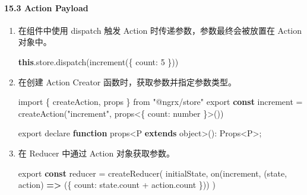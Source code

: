 \documentclass[
]{article}
\newenvironment{Shaded}{}{}
\newcommand{\AttributeTok}[1]{\textcolor[rgb]{0.49,0.56,0.16}{#1}}
\newcommand{\DataTypeTok}[1]{\textcolor[rgb]{0.56,0.13,0.00}{#1}}
\newcommand{\DecValTok}[1]{\textcolor[rgb]{0.25,0.63,0.44}{#1}}
\newcommand{\FunctionTok}[1]{\textcolor[rgb]{0.02,0.16,0.49}{#1}}
\newcommand{\ImportTok}[1]{#1}
\newcommand{\KeywordTok}[1]{\textcolor[rgb]{0.00,0.44,0.13}{\textbf{#1}}}
\newcommand{\NormalTok}[1]{#1}
\newcommand{\OperatorTok}[1]{\textcolor[rgb]{0.40,0.40,0.40}{#1}}
\newcommand{\StringTok}[1]{\textcolor[rgb]{0.25,0.44,0.63}{#1}}
\begin{document}
\hypertarget{153-action-payload}{%
\paragraph{15.3 Action Payload}\label{153-action-payload}}

\begin{enumerate}
\def\labelenumi{\arabic{enumi}.}
\item
  在组件中使用 dispatch 触发 Action 时传递参数，参数最终会被放置在
  Action 对象中。

\begin{Shaded}
\begin{Highlighting}[]
\KeywordTok{this}\OperatorTok{.}\AttributeTok{store}\OperatorTok{.}\FunctionTok{dispatch}\NormalTok{(}\FunctionTok{increment}\NormalTok{(\{ }\DataTypeTok{count}\OperatorTok{:} \DecValTok{5}\NormalTok{ \}))}
\end{Highlighting}
\end{Shaded}
\item
  在创建 Action Creator 函数时，获取参数并指定参数类型。

\begin{Shaded}
\begin{Highlighting}[]
\ImportTok{import}\NormalTok{ \{ createAction}\OperatorTok{,}\NormalTok{ props \} }\ImportTok{from} \StringTok{"@ngrx/store"}
\ImportTok{export} \KeywordTok{const}\NormalTok{ increment }\OperatorTok{=} \FunctionTok{createAction}\NormalTok{(}\StringTok{"increment"}\OperatorTok{,}\NormalTok{ props}\OperatorTok{\textless{}}\NormalTok{\{ }\DataTypeTok{count}\OperatorTok{:}\NormalTok{ number \}}\OperatorTok{\textgreater{}}\NormalTok{())}
\end{Highlighting}
\end{Shaded}

\begin{Shaded}
\begin{Highlighting}[]
\ImportTok{export}\NormalTok{ declare }\KeywordTok{function}\NormalTok{ props}\OperatorTok{\textless{}}\NormalTok{P }\KeywordTok{extends}\NormalTok{ object}\OperatorTok{\textgreater{}}\NormalTok{()}\OperatorTok{:}\NormalTok{ Props}\OperatorTok{\textless{}}\NormalTok{P}\OperatorTok{\textgreater{};}
\end{Highlighting}
\end{Shaded}
\item
  在 Reducer 中通过 Action 对象获取参数。

\begin{Shaded}
\begin{Highlighting}[]
\ImportTok{export} \KeywordTok{const}\NormalTok{ reducer }\OperatorTok{=} \FunctionTok{createReducer}\NormalTok{(}
\NormalTok{  initialState}\OperatorTok{,}
  \FunctionTok{on}\NormalTok{(increment}\OperatorTok{,}\NormalTok{ (state}\OperatorTok{,}\NormalTok{ action) }\KeywordTok{=\textgreater{}}\NormalTok{ (\{ }\DataTypeTok{count}\OperatorTok{:}\NormalTok{ state}\OperatorTok{.}\AttributeTok{count} \OperatorTok{+}\NormalTok{ action}\OperatorTok{.}\AttributeTok{count}\NormalTok{ \}))}
\NormalTok{)}
\end{Highlighting}
\end{Shaded}
\end{enumerate}
\end{document}
